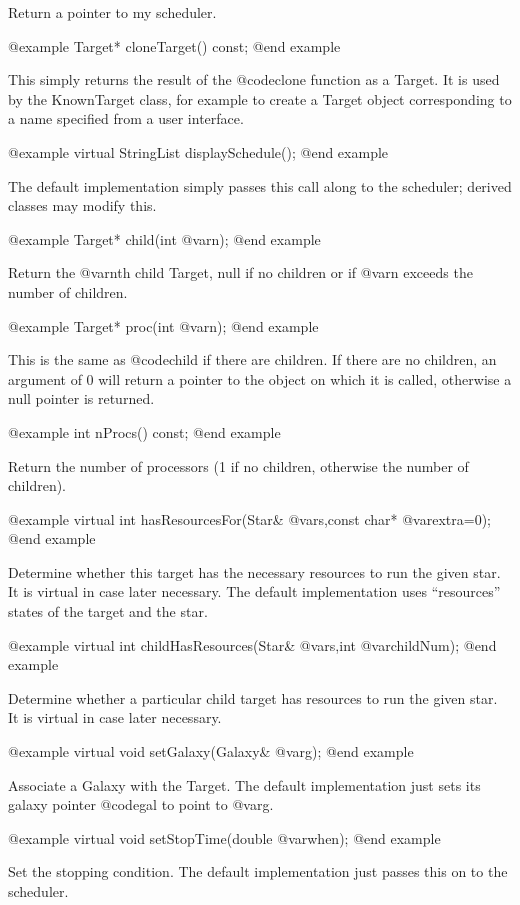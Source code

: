 Return a pointer to my scheduler.

@example
Target* cloneTarget() const;
@end example

This simply returns the result of the @code{clone} function as a Target.
It is used by the KnownTarget class, for example to create a Target
object corresponding to a name specified from a user interface.

@example
virtual StringList displaySchedule();
@end example

The default implementation simply passes this call along to the
scheduler; derived classes may modify this.

@example
Target* child(int @var{n});
@end example

Return the @var{n}th child Target, null if no children or if
@var{n} exceeds the number of children.

@example
Target* proc(int @var{n});
@end example

This is the same as @code{child} if there are children.  If
there are no children, an argument of 0 will return a pointer
to the object on which it is called, otherwise a null pointer
is returned.

@example
int nProcs() const;
@end example

Return the number of processors (1 if no children, otherwise the
number of children).

@example
virtual int hasResourcesFor(Star& @var{s},const char* @var{extra}=0);
@end example

Determine whether this target has the necessary resources to run the
given star.  It is virtual in case later necessary.  The default implementation
uses ``resources'' states of the target and the star.

@example
virtual int childHasResources(Star& @var{s},int @var{childNum});
@end example

Determine whether a particular child target has resources
to run the given star.  It is virtual in case later necessary.

@example
virtual void setGalaxy(Galaxy& @var{g});
@end example

Associate a Galaxy with the Target.  The default implementation
just sets its galaxy pointer @code{gal} to point to @var{g}.

@example
virtual void setStopTime(double @var{when});
@end example

Set the stopping condition.  The default implementation just passes
this on to the scheduler.

